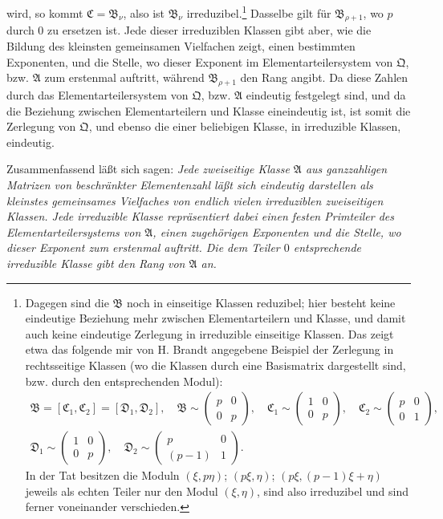 \documentclass[11pt]{article}
\begin{document}
wird, so kommt $\mathfrak C=\mathfrak B_\nu$, also ist $\mathfrak B_\nu$ irreduzibel.\footnote{Dagegen sind die $\mathfrak B$ noch in einseitige Klassen reduzibel; hier besteht keine eindeutige Beziehung mehr zwischen Elementarteilern und Klasse, und damit auch keine eindeutige Zerlegung in irreduzible einseitige Klassen. Das zeigt etwa das folgende mir von H. Brandt angegebene Beispiel der Zerlegung in rechtsseitige Klassen (wo die Klassen durch eine Basismatrix dargestellt sind, bzw. durch den entsprechenden Modul):
\[
\begin{gathered}
 \mathfrak B=[\mathfrak C_1,\mathfrak C_2]=[\mathfrak D_1,\mathfrak D_2],\quad
 \mathfrak B\sim\begin{pmatrix}p&0\\0&p\end{pmatrix},\quad
 \mathfrak C_1\sim\begin{pmatrix}1&0\\0&p\end{pmatrix},\quad
 \mathfrak C_2\sim\begin{pmatrix}p&0\\0&1\end{pmatrix},\\
 \mathfrak D_1\sim\begin{pmatrix}1&0\\0&p\end{pmatrix},
 \quad
 \mathfrak D_2\sim\begin{pmatrix}p&0\\(p-1)&1\end{pmatrix}.
\end{gathered}
\]
In der Tat besitzen die Moduln $(\xi,p\eta)$; $(p\xi,\eta)$; $(p\xi,(p-1)\xi+\eta)$ jeweils als echten Teiler nur den Modul $(\xi,\eta)$, sind also irreduzibel und sind ferner voneinander verschieden.} Dasselbe gilt für $\mathfrak B_{\rho+1}$, wo $p$ durch $0$ zu ersetzen ist. Jede dieser irreduziblen Klassen gibt aber, wie die Bildung des kleinsten gemeinsamen Vielfachen zeigt, einen bestimmten Exponenten, und die Stelle, wo dieser Exponent im Elementarteilersystem von $\mathfrak Q$, bzw. $\mathfrak A$ zum erstenmal auftritt, während $\mathfrak B_{\rho+1}$ den Rang angibt. Da diese Zahlen durch das Elementarteilersystem von $\mathfrak Q$, bzw. $\mathfrak A$ eindeutig festgelegt sind, und da die Beziehung zwischen Elementarteilern und Klasse eineindeutig ist, ist somit die Zerlegung von $\mathfrak Q$, und ebenso die einer beliebigen Klasse, in irreduzible Klassen, eindeutig.

Zusammenfassend läßt sich sagen: \emph{Jede zweiseitige Klasse $\mathfrak A$ aus ganzzahligen Matrizen von beschränkter Elementenzahl läßt sich eindeutig darstellen als kleinstes gemeinsames Vielfaches von endlich vielen irreduziblen zweiseitigen Klassen. Jede irreduzible Klasse repräsentiert dabei einen festen Primteiler des Elementarteilersystems von $\mathfrak A$, einen zugehörigen Exponenten und die Stelle, wo dieser Exponent zum erstenmal auftritt. Die dem Teiler $0$ entsprechende irreduzible Klasse gibt den Rang von $\mathfrak A$ an.}
\end{document}
